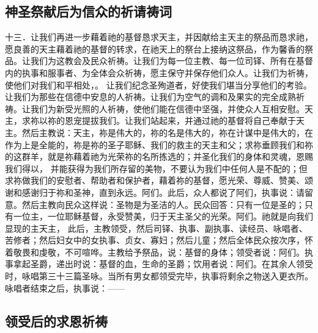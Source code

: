 
\subsection{神圣祭献后为信众的祈请祷词}

十三．让我们再进一步藉着祂的基督恳求天主，并因献给主天主的祭品而恳求祂，愿良善的天主藉着祂的基督的转求，在祂天上的祭台上接纳这祭品，作为馨香的祭品。让我们为这教会及民众祈祷。让我们为每一位主教、每一位司铎、所有在基督内的执事和服事者、为全体会众祈祷，愿主保守并保存他们众人。让我们为祈祷，使他们对我们和平相处，。 让我们纪念圣殉道者，好使我们堪当分享他们的考验。让我们为那些在信德中安息的人祈祷。让我们为空气的调和及果实的完全成熟祈祷。让我们为新受光照的人祈祷，使他们能在信德中坚强，并使众人互相安慰。天主，求祢以祢的恩宠提拔我们。让我们站起来，并通过祂的基督将自己奉献于天主。然后主教说：天主，祢是伟大的，祢的名是伟大的，祢在计谋中是伟大的，在作为上是全能的，祢是祢的圣子耶稣、我们的救主的天主和父；求祢垂顾我们和祢的这群羊，就是祢藉着祂为光荣祢的名所拣选的；并圣化我们的身体和灵魂，恩赐我们得以， 并能获得为我们所存留的美物，不要认为我们中任何人是不配的；但求祢做我们的安慰者、帮助者和保护者，藉着祢的基督，愿光荣、尊威、赞美、颂谢和感谢归于祢和圣神，直到永远。阿们。此后，众人都说了阿们，执事说：请留意。然后主教向民众这样说：圣物是为圣洁的人。民众回答：只有一位是圣的；只有一位主，一位耶稣基督，永受赞美，归于天主圣父的光荣。阿们。祂就是向我们显现的主天主， 此后，主教领受，然后司铎、执事、副执事、读经员、咏唱者、苦修者；然后妇女中的女执事、贞女、寡妇；然后儿童；然后全体民众按次序，怀着敬畏和虔敬，不可喧哗。主教给予祭品，说：基督的身体；领受者说：阿们。执事拿起圣爵，递出时说：基督的血，生命的圣爵；饮用者说：阿们。在其余人领受时，咏唱第三十三篇圣咏。当所有男女都领受完毕，执事将剩余之物送入更衣所。咏唱者结束之后，执事说：——\par


\subsection{领受后的求恩祈祷}

